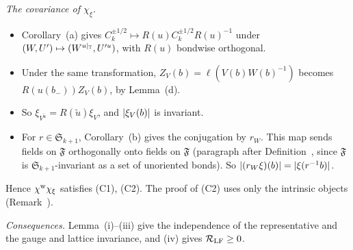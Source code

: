 \begin{detail}\label{xa:d-sfstep-def}
\emph{The covariance of $\chi_\xi$.}
\begin{itemize}
\item Corollary~(a) gives $C_k^{\pm1/2}\mapsto R(u)C_k^{\pm1/2}R(u)^{-1}$ under $(W,U')\mapsto(W^{u|_\mathbb T},U'^u)$, with $R(u)$ bondwise orthogonal.
\item Under the same transformation, $Z_V(b)=\ell(V(b)W(b)^{-1})$ becomes $R(u(b_-))Z_V(b)$, by Lemma~(d).
\item So $\xi_{V^{\tilde u}}=R(\tilde u)\xi_V$, and $\lvert\xi_V(b)\rvert$ is invariant.
\item For $r\in\mathfrak S_{k+1}$, Corollary~(b) gives the conjugation by $r_W$. This map sends fields on $\mathfrak F$ orthogonally onto fields on $\mathfrak F$ (paragraph after Definition~, since $\mathfrak F$ is $\mathfrak S_{k+1}$-invariant as a set of unoriented bonds). So $\lvert(r_W\xi)(b)\rvert=\lvert\xi(r^{-1}b)\rvert$.
\end{itemize}
Hence $\chi^{\rm w}\chi_\xi$ satisfies (C1), (C2). The proof of (C2) uses only the intrinsic objects (Remark~).

\emph{Consequences.} Lemma~(i)--(iii) give the independence of the representative and the gauge and lattice invariance, and (iv) gives $\mathcal R_{\rm LF}\ge0$.
\end{detail}

